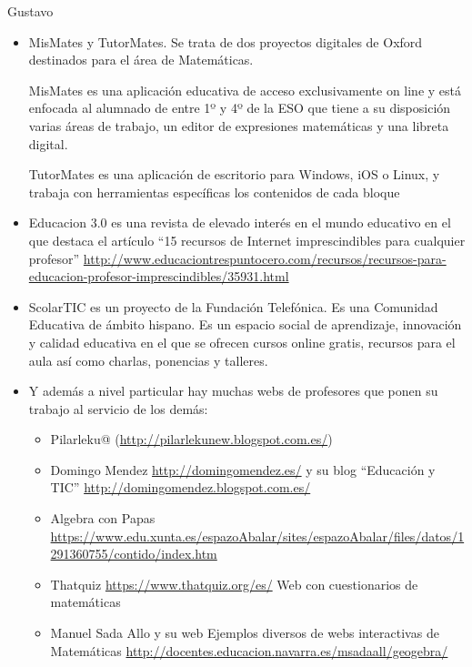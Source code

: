 \begin{opin}{\guscolor}{Gustavo}
\begin{itemize}
 

\item MisMates y TutorMates. Se trata de dos proyectos digitales de Oxford destinados para el área de Matemáticas.   

MisMates es una aplicación educativa de acceso exclusivamente on line y está enfocada al alumnado de entre 1º y 4º de la ESO que tiene a su disposición varias áreas de trabajo, un editor de expresiones matemáticas y una libreta digital.

TutorMates es una aplicación de escritorio para Windows, iOS o Linux, y trabaja con herramientas específicas los contenidos de cada bloque

 

\item Educacion 3.0 es una revista de elevado interés en el mundo educativo en el que destaca el artículo “15 recursos de Internet imprescindibles para cualquier profesor” \url{http://www.educaciontrespuntocero.com/recursos/recursos-para-educacion-profesor-imprescindibles/35931.html}  

 

\item ScolarTIC es un proyecto de la Fundación Telefónica. Es una Comunidad Educativa de ámbito hispano. Es un espacio social de aprendizaje, innovación y calidad educativa en el que se ofrecen cursos online gratis, recursos para el aula así como charlas, ponencias y talleres.  

 

\item Y además a nivel particular hay muchas webs de profesores que ponen su trabajo al servicio de los demás: 
\begin{itemize}
\item Pilarleku@ (\url{http://pilarlekunew.blogspot.com.es/}) 

\item Domingo Mendez \url{http://domingomendez.es/} y su blog “Educación y TIC” \url{http://domingomendez.blogspot.com.es/}  

\item Algebra con Papas \url{https://www.edu.xunta.es/espazoAbalar/sites/espazoAbalar/files/datos/1291360755/contido/index.htm}  

\item Thatquiz \url{https://www.thatquiz.org/es/} Web con cuestionarios de matemáticas 

\item Manuel Sada Allo y su web Ejemplos diversos de webs interactivas de Matemáticas \url{http://docentes.educacion.navarra.es/msadaall/geogebra/}  


\end{itemize}
\end{itemize}
\end{opin}
